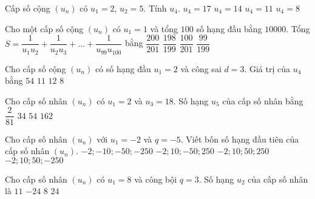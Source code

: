\begin{ex}
Cấp số cộng $(u_n)$ có $u_1=2$, $u_2=5$. Tính $u_4$.
\choice
{$u_4=17$}
{$u_4=14$}
{\True $u_4=11$}
{$u_4=8$}
\end{ex}
\begin{ex}
Cho một cấp số cộng $(u_n)$ có $u_1=1$ và tổng $100$ số hạng đầu bằng $10000$.
Tổng $S=\dfrac{1}{u_1u_2}+\dfrac{1}{u_2u_3}+ \ldots +\dfrac{1}{u_{99}u_{100}}$ bằng
\choice
{$\dfrac{200}{201}$}
{$\dfrac{198}{199}$}
{$\dfrac{100}{201}$}
{\True $\dfrac{99}{199}$}
\end{ex}
\begin{ex}
Cho cấp số cộng $(u_n)$ có số hạng đầu $u_1=2$ và công sai $d=3$. Giá trị của $u_4$ bằng
\choice
{$54$}
{\True $11$}
{$12$}
{$8$}
\end{ex}
\begin{ex}
Cho cấp số nhân $(u_n)$ có $u_1=2$ và $u_3=18$. Số hạng $u_5$ của cấp số nhân bằng
\choice
{$\dfrac{2}{81}$}
{$34$}
{$54$}
{\True $162$ }
\end{ex}
\begin{ex}
Cho cấp số nhân $(u_n)$ với $u_1=-2$ và $q=-5$. Viết bốn số hạng đầu tiên của cấp số nhân $(u_n)$.
\choice
{$-2;-10;-50;-250$}
{\True $-2;10;-50;250$}
{$-2;10;50;250$}
{$-2;10;50;-250$}
\end{ex}
\begin{ex}
Cho cấp số nhân $(u_n)$ có $u_1=8$ và công bội $q=3$. Số hạng $u_2$ của cấp số nhân là
\choice
{$11$}
{$-24$}
{$8$}
{\True $24$}
\end{ex}
